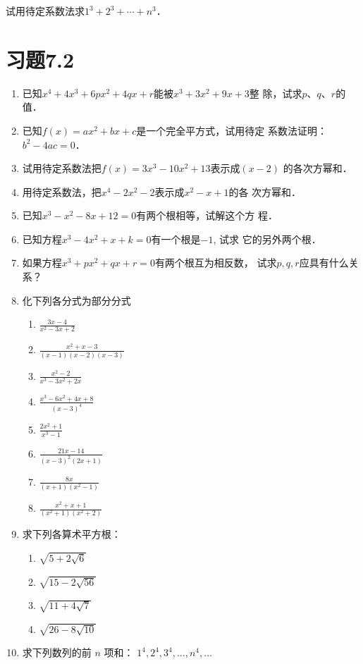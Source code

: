 \begin{ex}
    试用待定系数法求$1^3+2^3+\cdots+n^3$．
\end{ex}



\section*{习题7.2}
\begin{enumerate}
    \item 已知$x^4+4x^3+6px^2+4qx+r$能被$x^3+3x^2+9x+3$整
    除，试求$p$、$q$、$r$的值．
    \item 已知$f(x)=ax^2+bx+c$是一个完全平方式，试用待定
    系数法证明：$b^2-4ac=0$．
    \item 试用待定系数法把$f(x)=3x^3-10x^2+13$表示成$(x-2)$
    的各次方幂和．
    \item 用待定系数法，把$x^4-2x^2-2$表示成$x^2-x+1$的各
    次方幂和．
    \item 已知$x^3-x^2-8x+12=0$有两个根相等，试解这个方
    程．
    \item 已知方程$x^3-4x^2+x+k=0$有一个根是$-1$, 试求
    它的另外两个根．
    \item  如果方程$x^3+px^2+qx+r=0$有两个根互为相反数，
    试求$p,q,r$应具有什么关系？
    \item  化下列各分式为部分分式
    \begin{multicols}{2}
  \begin{enumerate}
\item  $\frac{3 x-4}{x^{2}-3 x+2}$
\item  $\frac{x^{2}+x-3}{(x-1)(x-2)(x-3)}$
\item $\frac{x^{2}-2}{x^{3}-3 x^{2}+2 x}$
\item  $\frac{x^{3}-6 x^{2}+4 x+8}{(x-3)^{4}}$
\item  $\frac{2 x^{2}+1}{x^{3}-1}$
\item  $\frac{21 x-14}{(x-3)^{2}(2 x+1)}$
\item  $\frac{8 x}{(x+1)\left(x^{2}-1\right)}$
\item  $\frac{x^{2}+x+1}{\left(x^{2}+1\right)\left(x^{2}+2\right)}$
\end{enumerate}      
    \end{multicols}

\item 求下列各算术平方根：
\begin{multicols}{2}
   \begin{enumerate}
    \item  $\sqrt{5+2 \sqrt{6}}$
    \item  $\sqrt{15-2 \sqrt{56}}$
    \item  $\sqrt{11+4 \sqrt{7}}$
    \item  $\sqrt{26-8 \sqrt{10}}$  
\end{enumerate}     
\end{multicols}

\item 求下列数列的前 $n$ 项和：
    $1^{4}, 2^{4}, 3^{4}, \ldots , n^{4}, \ldots$

\end{enumerate}






